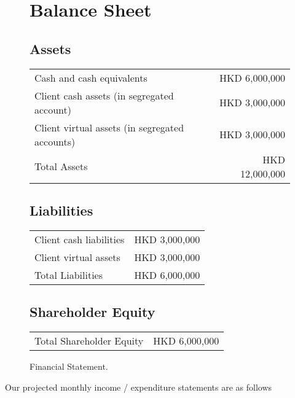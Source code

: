 \begin{figure}[h]
  \centering
  \caption{Financial Statement.}
  \label{fig:financial_statement}
  
  \section*{Balance Sheet}
  
  \subsection*{Assets}
  \begin{tabular}{lr}
    Cash and cash equivalents & HKD 6,000,000 \\
    Client cash assets (in segregated account) & HKD 3,000,000 \\
    Client virtual assets (in segregated accounts) & HKD 3,000,000 \\
    \midrule
    Total Assets & HKD 12,000,000 \\
  \end{tabular}
  
  \subsection*{Liabilities}
  \begin{tabular}{lr}
    Client cash liabilities & HKD 3,000,000 \\
    Client virtual assets & HKD 3,000,000 \\
    \midrule
    Total Liabilities & HKD 6,000,000 \\
  \end{tabular}
  
  \subsection*{Shareholder Equity}
  \begin{tabular}{lr}
    Total Shareholder Equity & HKD 6,000,000 \\
  \end{tabular}  
\end{figure}

Our projected monthly income / expenditure statements are as follows

